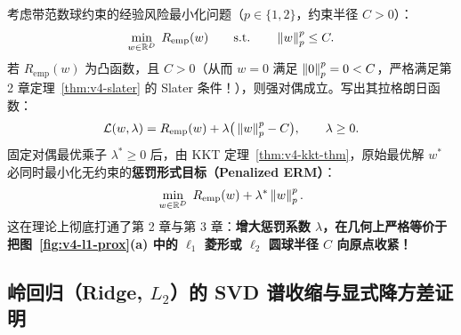 考虑带范数球约束的经验风险最小化问题（$p \in \{1, 2\}$，约束半径 $C > 0$）：
\begin{equation}\label{eq:v4-reg-constrained}
  \min_{w \in \mathbb{R}^D}\; R_{\mathrm{emp}}(w) \qquad\text{s.t.}\qquad \left\|w\right\|_p^p \le C.
\end{equation}
若 $R_{\mathrm{emp}}(w)$ 为凸函数，且 $C > 0$（从而 $w = 0$ 满足 $\left\|0\right\|_p^p = 0 < C$，严格满足第 2 章定理~\ref{thm:v4-slater} 的 Slater 条件！），则强对偶成立。写出其拉格朗日函数：
\[
  \mathcal{L}(w, \lambda) = R_{\mathrm{emp}}(w) + \lambda\big(\left\|w\right\|_p^p - C\big), \qquad \lambda \ge 0.
\]
固定对偶最优乘子 $\lambda^* \ge 0$ 后，由 KKT 定理~\ref{thm:v4-kkt-thm}，原始最优解 $w^*$ 必同时最小化无约束的\textbf{惩罚形式目标（Penalized ERM）}：
\begin{equation}\label{eq:v4-reg-penalized}
  \min_{w \in \mathbb{R}^D}\; R_{\mathrm{emp}}(w) + \lambda^*\left\|w\right\|_p^p.
\end{equation}
这在理论上彻底打通了第 2 章与第 3 章：\textbf{增大惩罚系数 $\lambda$，在几何上严格等价于把图~\ref{fig:v4-l1-prox}(a) 中的 $\ell_1$ 菱形或 $\ell_2$ 圆球半径 $C$ 向原点收紧！}

\subsection{岭回归（Ridge, $L_2$）的 SVD 谱收缩与显式降方差证明}


